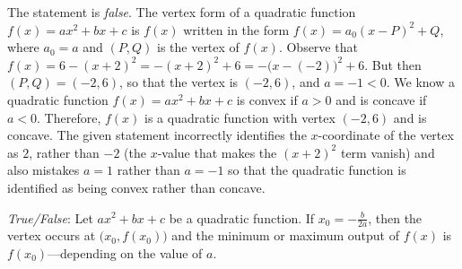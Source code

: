 \documentclass[11pt,letterpaper]{article}
\begin{document}
\sol The statement is \textit{false}. The vertex form of a quadratic function $f(x)= ax^2 + bx + c$ is $f(x)$ written in the form $f(x)= a_0(x - P)^2 + Q$, where $a_0= a$ and $(P, Q)$ is the vertex of $f(x)$. Observe that $f(x)= 6 - (x + 2)^2= -(x + 2)^2 + 6= -\big(x - (-2) \big)^2 + 6$. But then $(P, Q)= (-2, 6)$, so that the vertex is $(-2, 6)$, and $a= -1 < 0$. We know a quadratic function $f(x)= ax^2 + bx + c$ is convex if $a > 0$ and is concave if $a < 0$. Therefore, $f(x)$ is a quadratic function with vertex $(-2, 6)$ and is concave. The given statement incorrectly identifies the $x$-coordinate of the vertex as $2$, rather than $-2$ (the $x$-value that makes the $(x + 2)^2$ term vanish) and also mistakes $a= 1$ rather than $a= -1$ so that the quadratic function is identified as being convex rather than concave. \pvspace{1.3cm}



\quizsol \textit{True/False}: Let $ax^2 + bx + c$ be a quadratic function. If $x_0= -\frac{b}{2a}$, then the vertex occurs at $\big(x_0, f(x_0) \big)$ and the minimum or maximum output of $f(x)$ is $f(x_0)$---depending on the value of $a$. \pspace
\end{document}
